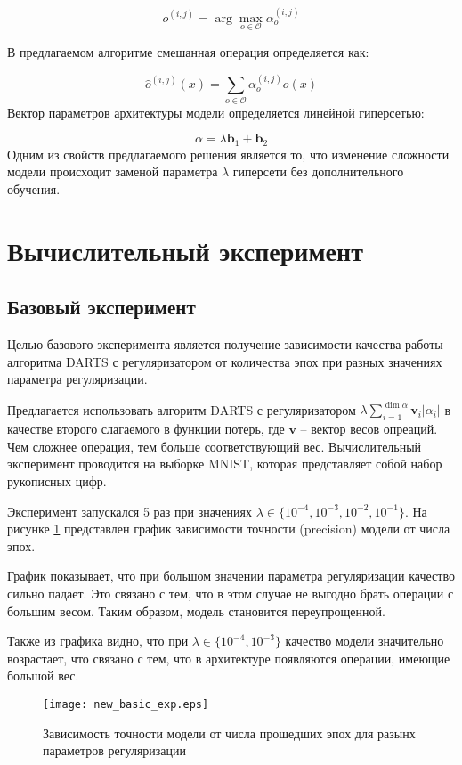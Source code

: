 \documentclass[12pt, twoside]{article}
\begin{document}
$$o^{(i, j)} =\arg\max_{o\in\mathcal{O}}\alpha_o^{(i, j)}$$

В предлагаемом алгоритме смешанная операция определяется как:
 
 $$\hat{o}^{(i, j)}(x) = \sum_{o\in \mathcal{O}}\alpha^{(i, j)}_oo(x)$$
Вектор параметров архитектуры модели определяется линейной гиперсетью:

$$\alpha = \lambda\mathbf{b}_1 + \mathbf{b}_2$$
Одним из свойств предлагаемого решения является то, что изменение сложности модели происходит заменой параметра $\lambda$ гиперсети без дополнительного обучения.


 
 \section{Вычислительный эксперимент}
 
 \subsection{Базовый эксперимент}
 Целью базового эксперимента является получение зависимости качества работы алгоритма DARTS с регуляризатором от количества эпох при разных значениях параметра регуляризации.
 
 Предлагается использовать алгоритм DARTS с регуляризатором $\lambda\sum_{i=1}^{\dim\alpha}\mathbf{v}_i|\alpha_i|$ в качестве второго слагаемого в функции потерь, где $\mathbf{v}$ -- вектор весов опреаций. Чем сложнее операция, тем больше соответствующий вес. Вычислительный эксперимент проводится на выборке MNIST\cite{lecun-mnisthandwrittendigit-2010}, которая представляет собой набор рукописных цифр.
 
Эксперимент запускался 5 раз при значениях $\lambda \in \{10^{-4}, 10^{-3}, 10^{-2}, 10^{-1}\}$. На рисунке \ref{fig:basic_exp} представлен график зависимости точности (precision) модели от числа эпох.

График показывает, что при большом значении параметра регуляризации качество сильно падает. Это связано с тем, что в этом случае не выгодно брать операции с большим весом. Таким образом, модель становится переупрощенной.

 Также из графика видно, что при $\lambda \in \{10^{-4}, 10^{-3}\}$ качество модели значительно возрастает, что связано с тем, что в архитектуре появляются операции, имеющие большой вес.

\begin{figure}[H]
\centering
  \texttt{[image: new\_basic\_exp.eps]}
  \caption{Зависимость точности модели от числа прошедших эпох для разынх параметров регуляризации}
  \label{fig:basic_exp}
\end{figure}
\end{document}
